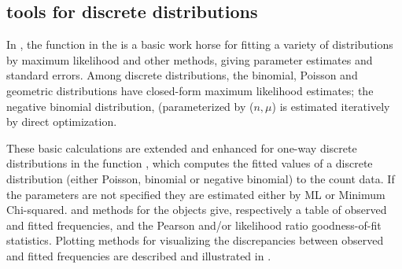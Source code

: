 \documentclass[11pt]{book}
\begin{document}
\subsection[R tools for discrete distributions]{\R tools for discrete distributions}\label{sec:fitdistr}
In \R, the function  in the 
is a basic work horse for fitting a variety of distributions
by maximum likelihood and other methods, giving parameter estimates
and standard errors.
Among discrete distributions, the binomial,
Poisson and geometric distributions have closed-form 
maximum likelihood estimates; the negative binomial distribution,
(parameterized by ($n, \mu$) is estimated iteratively by direct
optimization.

These basic calculations are extended and enhanced for one-way
discrete distributions in the  function
, which 
computes the fitted values of a discrete distribution (either Poisson, binomial or negative binomial) to the count data. 
If the parameters are not specified they are estimated either by ML or Minimum Chi-squared.  and  methods for
the  objects give, respectively a table of
observed and fitted frequencies, and the Pearson and/or likelihood
ratio goodness-of-fit statistics. Plotting methods for visualizing
the discrepancies between observed and fitted frequencies are
described and illustrated in .
\end{document}
